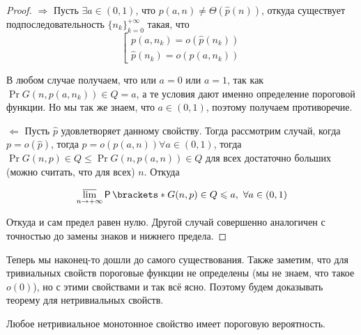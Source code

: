 \begin{proof}
  $\Rightarrow$ Пусть $\exists a \in (0, 1)$, что $p(a, n) \neq \Theta(\hat{p}(n))$,
  откуда существует подпоследовательность $\{n_k\}_{k = 0}^{+\infty}$ такая,
  что 
  \[
    \left[
      \begin{aligned}
        p(a, n_k) = o(\hat{p}(n_k))\\
        \hat{p}(n_k) = o(p(a, n_k))
      \end{aligned}
    \right.
  \]

  В любом случае получаем, что или $a = 0$ или $a = 1$, так как $\Pr{G(n, p(a, 
  n_k)) \in Q} = a$, а те условия дают именно определение пороговой функции. Но
  мы так же знаем, что $a \in (0, 1)$, поэтому получаем противоречие.

  $\Leftarrow$ Пусть $\hat{p}$ удовлетворяет данному свойству. Тогда рассмотрим
  случай, когда $p = o(\hat{p})$, тогда $p = o(p(a, n)) \forall a \in (0, 1)$,
  тогда $\Pr{G(n, p) \in Q} \leq \Pr{G(n, p(a, n)) \in Q}$ для всех достаточно
  больших (можно считать, что для всех) $n$. Откуда

  \[
    \varlimsup\limits_{n \to +\infty} \Pr{G(n, p) \in Q} \leqslant a, \ \forall a \in (0, 1)
  \]

  Откуда и сам предел равен нулю. Другой случай совершенно аналогичен с точностью
  до замены знаков и нижнего предела.
\end{proof}

Теперь мы наконец-то дошли до самого существования. Также заметим, что для
тривиальных свойств пороговые функции не определены (мы не знаем, что такое
$o(0)$), но с этими свойствами и так всё ясно. Поэтому будем доказывать теорему
для нетривиальных свойств.

\begin{theorem}
  Любое нетривиальное монотонное свойство имеет пороговую вероятность.
\end{theorem}

